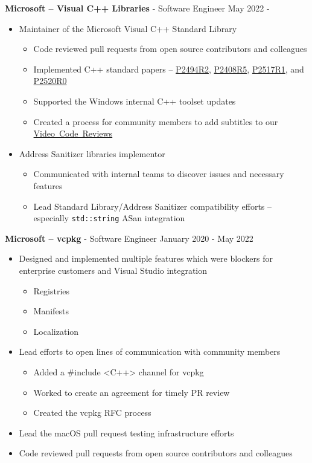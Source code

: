 \documentclass[11pt]{article}
\newcommand{\job}[3]{
  \begingroup
    \textbf{\small#1} - \small#2
    \hfill\color{black!70}\small{#3}
  \endgroup
}
\newcommand{\spacevv}{
  \vspace{2mm}
}
\begin{document}
\begin{paracol}{2}
{\job{Microsoft -- Visual C++ Libraries}{Software Engineer}{May 2022 -}
\begin{itemize}
  \item Maintainer of the Microsoft Visual C++ Standard Library
  \begin{itemize}
    \item Code reviewed pull requests from open source contributors and colleagues
    \item Implemented C++ standard papers --
    \href{https://wg21.link/p2494r2}{P2494R2},
    \href{https://wg21.link/p2408r5}{P2408R5},
    \href{https://wg21.link/p2517r1}{P2517R1},
    and \href{https://wg21.link/p2520r0}{P2520R0}
    \item Supported the Windows internal C++ toolset updates
    \item Created a process for community members to add subtitles to our \href{https://github.com/microsoft/STL/wiki/Code-Review-Videos}{Video~Code~Reviews}
  \end{itemize}
  \item Address Sanitizer libraries implementor
  \begin{itemize}
    \item Communicated with internal teams to discover issues and necessary features
    \item Lead Standard Library/Address Sanitizer compatibility efforts -- especially \texttt{std::string} ASan integration
  \end{itemize}
\end{itemize}
\spacevv

\job{Microsoft -- vcpkg}{Software Engineer}{January 2020 - May 2022}
\begin{itemize}
  \item Designed and implemented multiple features which were blockers for enterprise customers and Visual Studio integration
  \begin{itemize}
    \item Registries
    \item Manifests
    \item Localization
  \end{itemize}
  \item Lead efforts to open lines of communication with community members
  \begin{itemize}
    \item Added a \#include <C++> channel for vcpkg
    \item Worked to create an agreement for timely PR review
    \item Created the vcpkg RFC process
  \end{itemize}
  \item Lead the macOS pull request testing infrastructure efforts
  \item Code reviewed pull requests from open source contributors and colleagues
\end{itemize}
\spacevv

}
\end{paracol}
\end{document}
